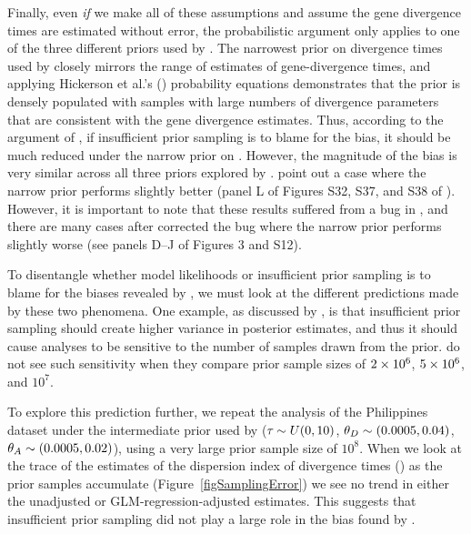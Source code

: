 Finally, even \emph{if} we make all of these assumptions and assume the gene
divergence times are estimated without error, the probabilistic argument only
applies to one of the three different priors used by \citet{Oaks2012}.
The narrowest prior on divergence times used by \citet{Oaks2012} closely mirrors
the range of estimates of gene-divergence times, and applying Hickerson et al.'s
(\citeyear{Hickerson2013}) probability equations demonstrates that the prior
is densely populated with samples with large numbers of divergence parameters
that are consistent with the gene divergence estimates.
Thus, according to the argument of \citet{Hickerson2013}, if insufficient prior
sampling is to blame for the bias, it should be much reduced under the narrow
prior on \divt{}.
However, the magnitude of the bias is very similar across all three priors
explored by \citet{Oaks2012}.
\citet{Hickerson2013} point out a case where the narrow prior performs
slightly better (panel L of Figures S32, S37, and S38 of \citet{Oaks2012}).
However, it is important to note that these results suffered from a bug
in \msb, and there are many cases after \citet{Oaks2012} corrected the 
bug where the narrow prior performs slightly worse (see panels D--J of
Figures 3 and S12).

To disentangle whether model likelihoods or insufficient prior sampling is to
blame for the biases revealed by \citet{Oaks2012}, we must look at the
different predictions made by these two phenomena.
One example, as discussed by \citet{Oaks2012}, is that insufficient prior
sampling should create higher variance in posterior estimates, and thus it
should cause analyses to be sensitive to the number of samples drawn from the
prior.
\citet{Oaks2012} do not see such sensitivity when they compare prior sample
sizes of $2\times 10^{6}$, $5\times 10^{6}$, and $10^7$.

To explore this prediction further, we repeat the analysis of the Philippines
dataset under the intermediate prior used by \citet{Oaks2012} ($\tau_{} \sim U(0,
10)$, $\meanDescendantTheta{} \sim (0.0005, 0.04)$, $\ancestralTheta{} \sim
(0.0005, 0.02)$), using a very large prior sample size of $10^8$.
When we look at the trace of the estimates of the dispersion index of
divergence times (\vmratio{}) as the prior samples accumulate
(Figure~\ref{figSamplingError}) we see no trend in either the unadjusted or
GLM-regression-adjusted estimates.
This suggests that insufficient prior sampling did not play a large
role in the bias found by \citet{Oaks2012}.

